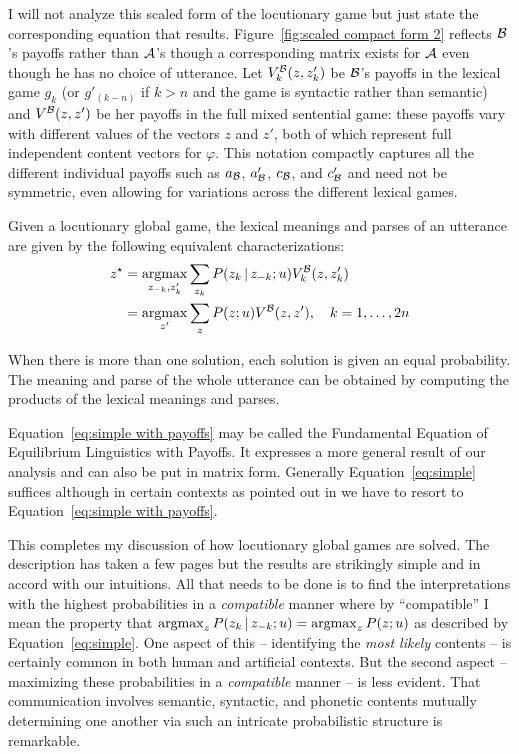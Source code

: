 I will not analyze this scaled form of the locutionary game but just state the corresponding equation that results. Figure~\ref{fig:scaled compact form 2} reflects $\cal B$'s payoffs rather than $\cal A$'s though a corresponding matrix exists for $\cal A$ even though he has no choice of utterance. Let $V^{\cal B}_k(z, z'_k)$ be $\cal B$'s payoffs in the lexical game $g_k$ (or $g'_{(k-n)}$ if $k > n$ and the game is syntactic rather than semantic) and $V^{\cal B}(z, z')$ be her payoffs in the full mixed sentential game: these payoffs vary with different values of the vectors $z$ and $z'$, both of which represent full independent content vectors for $\varphi$. This notation compactly captures all the different individual payoffs such as $a_{\cal B}$, $a'_{\cal B}$, $c_{\cal B}$, and $c'_{\cal B}$ and need not be  symmetric, even allowing for variations across the different lexical games.
 

\begin{theorem}
Given a locutionary global game, the lexical meanings and parses of an utterance are given by the following equivalent characterizations:
\begin{equation}\label{eq:simple with payoffs}
\begin{split}
z^\star & = \operatorname*{argmax}_{z_{-k}, z'_k} \sum_{z_k} P(z_k \,|\, z_{-k}; u)V^{\cal B}_k(z, z'_k)\\
        & = \operatorname*{argmax}_{z'} \sum_{z} P(z; u)V^{\cal B}(z, z'), \quad k = 1, \dots, 2n 
\end{split}
\end{equation}

\noindent When there is more than one solution, each solution is given an equal probability. The meaning and parse of the whole utterance can be obtained by computing the products of the lexical meanings and parses.

\label{thm:compatibility with payoffs}

\end{theorem}

\noindent Equation~\ref{eq:simple with payoffs} may be called the Fundamental Equation of Equilibrium Linguistics with Payoffs. It expresses a more general result of our analysis and can also be put in matrix form. Generally Equation~\ref{eq:simple} suffices although in certain contexts as pointed out in  we have to resort to Equation~\ref{eq:simple with payoffs}.

This completes my discussion of how locutionary global games are solved. The description has taken a few pages but the results are strikingly simple and in accord with our intuitions. All that needs to be done is to find the interpretations with the highest probabilities in a \emph{compatible} manner where by ``compatible'' I mean the property that $\operatorname*{argmax}_{z} P(z_k \,|\, z_{-k}; u) = \operatorname*{argmax}_{z} P(z; u)$ as described by Equation~\ref{eq:simple}. One aspect of this -- identifying the \emph{most likely} contents -- is certainly common in both human and artificial contexts. But the second aspect -- maximizing these probabilities in a \emph{compatible} manner -- is less evident. That communication involves semantic, syntactic, and phonetic contents mutually determining one another via such an intricate probabilistic structure is remarkable.

